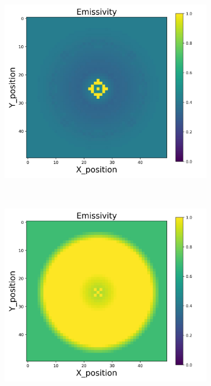 {\begin{figure}[h]
\begin{minipage}{\textwidth}
\begin{subfigure}{0.27\textwidth}
        \end{subfigure}
        \begin{subfigure}{0.27\textwidth}
            \centering
            \includegraphics[width=\textwidth]{figures/raw_data/21/T3500/lin_square/emi_cal.jpg}
        \end{subfigure}
    \end{minipage}\\
    \begin{minipage}{\textwidth}
        \centering
        \begin{subfigure}{0.27\textwidth}
            \centering
            \includegraphics[width=\textwidth]{figures/raw_data/22/T3500/lin_square/emi_cal.jpg}

\end{subfigure}
\end{minipage}
\end{figure}}
